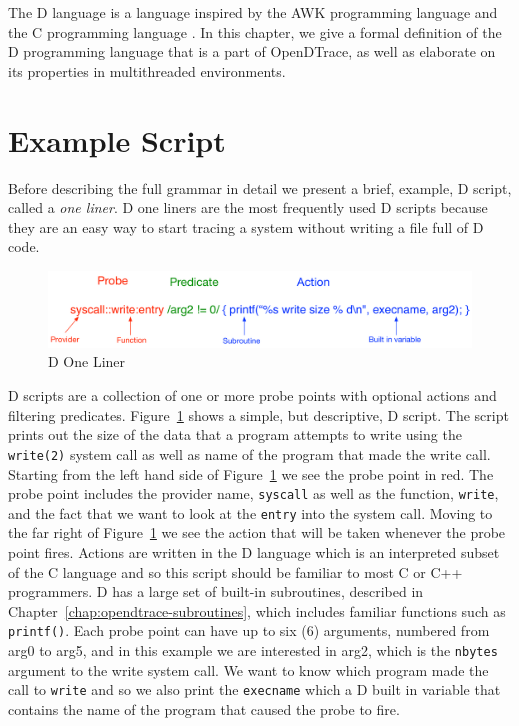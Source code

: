 The D language is a language inspired by the AWK programming language
\cite{Aho:1987:APL:29361} and the C programming language
\cite{DTrace2004}\cite{Kernighan:1988}. In this chapter, we give a
formal definition of the D programming language that is a part of
OpenDTrace, as well as elaborate on its properties in multithreaded
environments.

\section{Example Script}
\label{sec:example-script}

Before describing the full grammar in detail we present a brief,
example, D script, called a \emph{one liner}.  D one liners are the
most frequently used D scripts because they are an easy way to start
tracing a system without writing a file full of D code.  


\begin{figure}
  \centering
  \includegraphics[width=0.8\linewidth]{oneliner.pdf}
  \caption{D One Liner}
  \label{fig:d-one-liner}
\end{figure}

D scripts are a collection of one or more probe points with optional
actions and filtering predicates.  Figure~\ref{fig:d-one-liner} shows
a simple, but descriptive, D script.  The script prints out the size
of the data that a program attempts to write using the
\texttt{write(2)} system call as well as name of the program that made
the write call.  Starting from the left hand side of
Figure~\ref{fig:d-one-liner} we see the probe point in red.  The probe
point includes the provider name, \texttt{syscall} as well as the
function, \texttt{write}, and the fact that we want to look at the
\texttt{entry} into the system call.  Moving to the far right of
Figure~\ref{fig:d-one-liner} we see the action that will be taken
whenever the probe point fires.  Actions are written in the D language
which is an interpreted subset of the C language and so this script
should be familiar to most C or C++ programmers.  D has a large set of
built-in subroutines, described in Chapter~\ref{chap:opendtrace-subroutines},
which includes familiar functions such as \texttt{printf()}.  Each
probe point can have up to six (6) arguments, numbered from arg0 to
arg5, and in this example we are interested in arg2, which is the
\texttt{nbytes} argument to the write system call.  We want to know
which program made the call to \texttt{write} and so we also print the
\texttt{execname} which a D built in variable that contains the name
of the program that caused the probe to fire.


